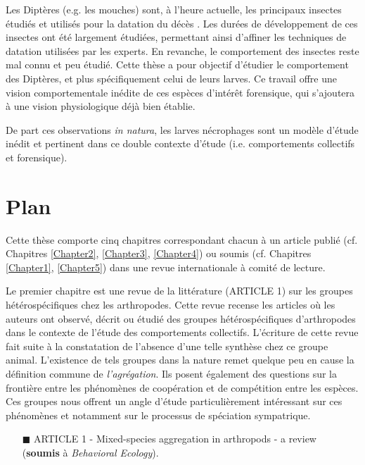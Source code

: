Les Diptères (e.g. les mouches) sont, à l'heure actuelle, les principaux insectes étudiés et utilisés pour la datation du décès \cite{charabidze_insectes_2014}. Les durées de développement de ces insectes ont été largement étudiées, permettant ainsi d'affiner les techniques de datation utilisées par les experts. En revanche, le comportement des insectes reste mal connu et peu étudié. Cette thèse a pour objectif d'étudier le comportement des Diptères, et plus spécifiquement celui de leurs larves. Ce travail offre une vision comportementale inédite de ces espèces d'intérêt forensique, qui s'ajoutera à une vision physiologique déjà bien établie.

De part ces observations \textit{in natura}, les larves nécrophages sont un modèle d'étude inédit et pertinent dans ce double contexte d'étude (i.e. comportements collectifs et forensique).





    \section{Plan}

Cette thèse comporte cinq chapitres correspondant chacun à un article publié (cf. Chapitres \ref{Chapter2}, \ref{Chapter3}, \ref{Chapter4}) ou soumis (cf. Chapitres \ref{Chapter1}, \ref{Chapter5}) dans une revue internationale à comité de lecture.

Le premier chapitre est une revue de la littérature (ARTICLE 1) sur les groupes hétérospécifiques chez les arthropodes. Cette revue recense les articles où les auteurs ont observé, décrit ou étudié des groupes hétérospécifiques d'arthropodes dans le contexte de l'étude des comportements collectifs. L'écriture de cette revue fait suite à la constatation de l'absence d'une telle synthèse chez ce groupe animal. L'existence de tels groupes dans la nature remet quelque peu en cause la définition commune de \textit{l'agrégation}. Ils posent également des questions sur la frontière entre les phénomènes de coopération et de compétition entre les espèces. Ces groupes nous offrent un angle d'étude particulièrement intéressant sur ces phénomènes et notamment sur le processus de spéciation sympatrique.

\begin{itemize} 
\item[\tiny{$\blacksquare$}] ARTICLE 1 - Mixed-species aggregation in arthropods - a review\\ (\textbf{soumis} à \textit{Behavioral Ecology}).
\end{itemize}

